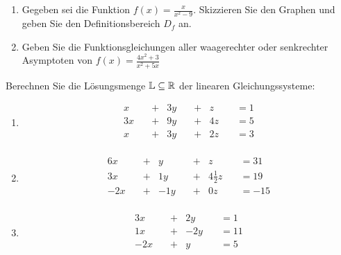 	\begin{enumerate}
		\item Gegeben sei die Funktion $f(x)=\frac{x}{x^2-9}$. Skizzieren Sie den Graphen und geben Sie den Definitionsbereich $D_f$ an.
		\item	Geben Sie die Funktionsgleichungen aller waagerechter oder senkrechter Asymptoten von $f(x)=\frac{4x^2+3}{x^2+5x}$
	\end{enumerate}



	\newcommand{\lgslinethree}[4]{#1 x\quad &+&  #2 y\quad &+&  #3 z\quad & = #4 \\}
	\newcommand{\lgslinetwo}[3]{#1 x\quad &+&  #2 y\quad & = #3 \\}
	Berechnen Sie die Lösungsmenge $\mathbb{L}\subseteq\mathbb{R}$ der linearen Gleichungssysteme:
	\begin{multicols}{2}
		\begin{enumerate}
			\item
			\begin{alignat*}{5}
				\lgslinethree{}{3}{}{1}
				\lgslinethree{3}{9}{4}{5}
				\lgslinethree{}{3}{2}{3}
			\end{alignat*}
			\item
			\begin{alignat*}{4}
				\lgslinethree{6}{}{}{31}
				\lgslinethree{3}{1}{4\frac 1 2}{19}
				\lgslinethree{-2}{-1}{0}{-15}
			\end{alignat*}
			\item
			\begin{alignat*}{4}
				\lgslinetwo{3}{2}{1}
				\lgslinetwo{1}{-2}{11}
				\lgslinetwo{-2}{}{5}
			\end{alignat*}
		\end{enumerate}
	\end{multicols}



